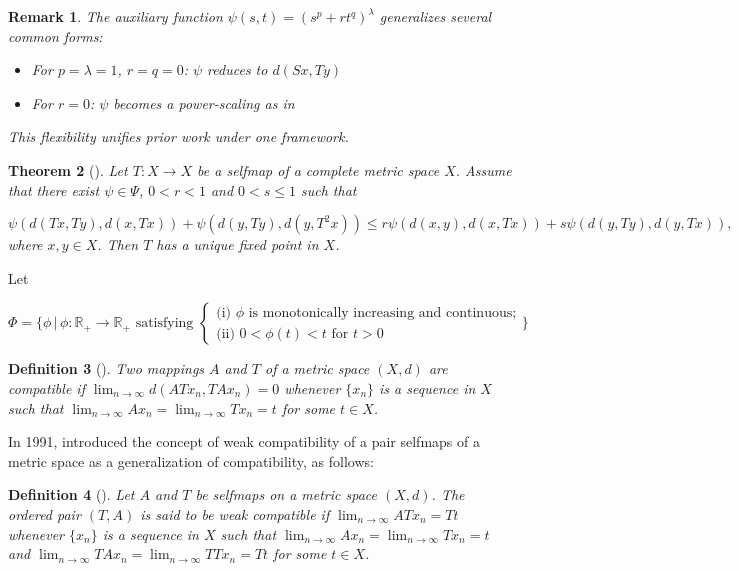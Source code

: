 \documentclass[11]{article}
\newtheorem{definition}{Definition}[section]
\newtheorem{theorem}[definition]{Theorem}
\newtheorem{remark}[definition]{Remark}
\numberwithin{equation}{section}
\begin{document}
\begin{remark}
The auxiliary function $\psi(s,t) = (s^p + r t^q)^\lambda$ generalizes several common forms:
\begin{itemize}
\item For $p = \lambda = 1$, $r = q = 0$: $\psi$ reduces to $d(Sx,Ty)$
\item For $r = 0$: $\psi$ becomes a power-scaling as in \cite{Rhoades1977}
\end{itemize}
This flexibility unifies prior work under one framework.
\end{remark}

\begin{theorem}[\cite{Choudhury2000}]
Let $T:X\to X$ be a selfmap of a complete metric space $X$. Assume that there exist $\psi\in\Psi$, $0<r<1$ and $0<s\leq 1$ such that

\[
\psi(d(Tx,Ty),d(x,Tx)) + \psi(d(y,Ty),d(y,T^{2}x)) \leq r\psi(d(x,y),d(x,Tx)) + s\psi(d(y,Ty),d(y,Tx)),
\]
where $x,y\in X$. Then $T$ has a unique fixed point in $X$.
\end{theorem}

Let 

\[
\Phi=\Bigg\{\phi\,|\,\phi:\mathbb{R}_{+}\to\mathbb{R}_{+} \text{ satisfying }
\begin{cases}
\text{(i) $\phi$ is monotonically increasing and continuous;} \\
\text{(ii) $0<\phi(t)<t$ for $t>0$}
\end{cases}
\Bigg\}
\]

\begin{definition}[\cite{Jungck1986}]
Two mappings $A$ and $T$ of a metric space $(X,d)$ are compatible if $\lim_{n\to\infty}d(ATx_{n},TAx_{n})=0$ whenever $\{x_{n}\}$ is a sequence in $X$ such that $\lim_{n\to\infty}Ax_{n}=\lim_{n\to\infty}Tx_{n}=t$ for some $t\in X$.
\end{definition}

In 1991, \cite{Antony1991} introduced the concept of weak compatibility of a pair selfmaps of a metric space as a generalization of compatibility, as follows:

\begin{definition}[\cite{Antony1991}]
Let $A$ and $T$ be selfmaps on a metric space $(X,d)$. The ordered pair $(T,A)$ is said to be weak compatible if $\lim_{n\to\infty}ATx_{n}=Tt$ whenever $\{x_{n}\}$ is a sequence in $X$ such that $\lim_{n\to\infty}Ax_{n}=\lim_{n\to\infty}Tx_{n}=t$ and $\lim_{n\to\infty}TAx_{n}=\lim_{n\to\infty}TTx_{n}=Tt$ for some $t\in X$.
\end{definition}
\end{document}
